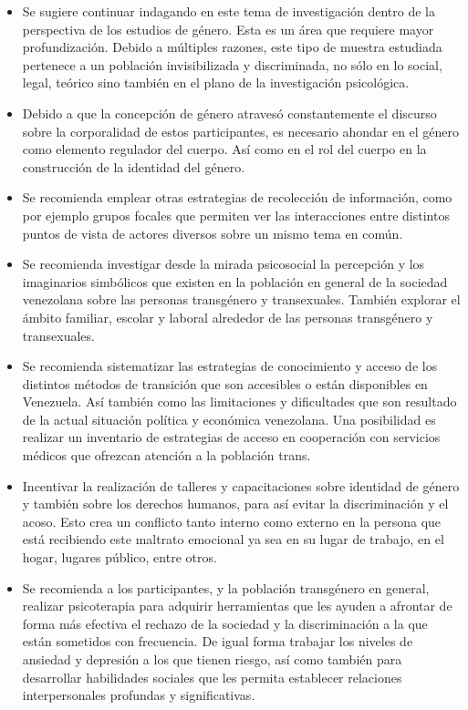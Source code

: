 \begin{itemize}

\item Se sugiere continuar indagando en este tema de
investigación dentro de la perspectiva de los estudios de género. Esta es un
área que requiere mayor profundización. Debido a múltiples razones, este tipo de
muestra estudiada pertenece a un población invisibilizada y discriminada, no
sólo en lo social, legal, teórico sino también en el plano de la investigación
psicológica.

\item Debido a que la concepción de género atravesó constantemente el discurso
sobre la corporalidad de estos participantes, es necesario ahondar en el género
como elemento regulador del cuerpo. Así como en el rol del cuerpo en la
construcción de la identidad del género.

\item Se recomienda emplear otras estrategias de recolección de información,
como por ejemplo grupos focales que permiten ver las interacciones entre
distintos puntos de vista de actores diversos sobre un mismo tema en común.

\item Se recomienda investigar desde la mirada psicosocial la percepción y los
imaginarios simbólicos que existen en la población en general de la sociedad
venezolana sobre las personas transgénero y transexuales. También explorar el
ámbito familiar, escolar y laboral alrededor de las personas transgénero y
transexuales.

\item Se recomienda sistematizar las estrategias de conocimiento y acceso de los
distintos métodos de transición que son accesibles o están disponibles en
Venezuela. Así también como las limitaciones y dificultades que son resultado de
la actual situación política y económica venezolana. Una posibilidad es realizar
un inventario de estrategias de acceso en cooperación con servicios médicos que
ofrezcan atención a la población trans.

\item Incentivar la realización de talleres y capacitaciones sobre identidad de
género y también sobre los derechos humanos, para así evitar la discriminación y
el acoso. Esto crea un conflicto tanto interno como externo en la persona que
está recibiendo este maltrato emocional ya sea en su lugar de trabajo, en
el hogar, lugares público, entre otros.

\item Se recomienda a los participantes, y la población transgénero en general,
realizar psicoterapia para adquirir herramientas que les ayuden a afrontar de
forma más efectiva el rechazo de la sociedad y la discriminación a la que están
sometidos con frecuencia. De igual forma trabajar los niveles de ansiedad y
depresión a los que tienen riesgo, así como también para desarrollar habilidades
sociales que les permita establecer relaciones interpersonales profundas y
significativas.

\end{itemize}
